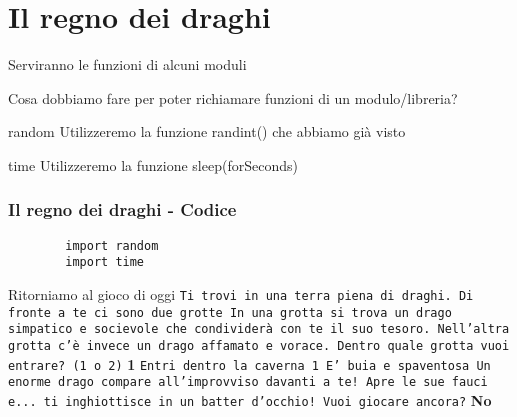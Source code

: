 \section{Il regno dei draghi}

\begin{frame}{Serviranno le funzioni di alcuni moduli}
    
Cosa dobbiamo fare per poter richiamare funzioni di un modulo/libreria? 
\begin{block}{random}
Utilizzeremo la funzione randint() che abbiamo già visto
\end{block}

\begin{block}{time}
Utilizzeremo la funzione sleep(forSeconds)
\end{block}

\end{frame}

\begin{frame}[fragile]
\frametitle{Il regno dei draghi - Codice}

    \begin{lstlisting}
        import random
        import time
    \end{lstlisting}

\end{frame}

\begin{frame}{Ritorniamo al gioco di oggi}
\texttt{Ti trovi in una terra piena di draghi.\newline
        Di fronte a te ci sono due grotte\newline
        In una grotta si trova un drago simpatico e socievole che condividerà con te il suo tesoro.\newline
        Nell'altra grotta c'è invece un drago affamato e vorace.\newline
        Dentro quale grotta vuoi entrare? (1 o 2)\newline}
\textbf{1\newline}
\texttt{Entri dentro la caverna 1\newline
        E' buia e spaventosa\newline
        Un enorme drago compare all'improvviso davanti a te! Apre le sue fauci e... ti inghiottisce in un batter d'occhio!\newline
        Vuoi giocare ancora?\newline}
\textbf{No}        
        
\end{frame}

